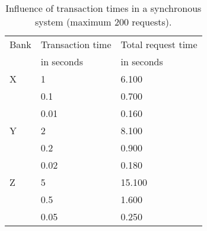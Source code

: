 \documentclass[10pt,a4paper,twocolumn]{article}
\begin{document}
\begin{table*}[]
	\begin{tabular}{lll}
		Bank				& Transaction time & Total request time\\
								& in seconds		   & in seconds	\\
		X					 & 1 						  & 6.100 \\
								& 0.1 						& 0.700 \\
								& 0.01 					   & 0.160 \\
		Y				   & 2 							& 8.100 \\
								& 0.2 						&  0.900\\
								& 0.02 					   & 0.180 \\
		Z				   & 5 							& 15.100 \\
								& 0.5 						&  1.600\\
								& 0.05 					   & 0.250
	\end{tabular}
	\caption{\label{tab:banking-time-influence-synchronous}Influence of transaction times in a synchronous system (maximum 200 requests).}
\end{table*}\noindent
\end{document}
